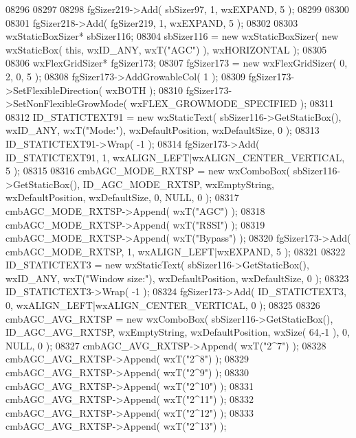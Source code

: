 \begin{DoxyCode}
08296     
08297     
08298     fgSizer219->Add( sbSizer97, 1, wxEXPAND, 5 );
08299     
08300     
08301     fgSizer218->Add( fgSizer219, 1, wxEXPAND, 5 );
08302     
08303     wxStaticBoxSizer* sbSizer116;
08304     sbSizer116 = \textcolor{keyword}{new} wxStaticBoxSizer( \textcolor{keyword}{new} wxStaticBox( \textcolor{keyword}{this}, wxID\_ANY, wxT(\textcolor{stringliteral}{"AGC"}) ), wxHORIZONTAL );
08305     
08306     wxFlexGridSizer* fgSizer173;
08307     fgSizer173 = \textcolor{keyword}{new} wxFlexGridSizer( 0, 2, 0, 5 );
08308     fgSizer173->AddGrowableCol( 1 );
08309     fgSizer173->SetFlexibleDirection( wxBOTH );
08310     fgSizer173->SetNonFlexibleGrowMode( wxFLEX\_GROWMODE\_SPECIFIED );
08311     
08312     ID_STATICTEXT91 = \textcolor{keyword}{new} wxStaticText( sbSizer116->GetStaticBox(), wxID\_ANY, wxT(\textcolor{stringliteral}{"Mode:"}), 
      wxDefaultPosition, wxDefaultSize, 0 );
08313     ID_STATICTEXT91->Wrap( -1 );
08314     fgSizer173->Add( ID_STATICTEXT91, 1, wxALIGN\_LEFT|wxALIGN\_CENTER\_VERTICAL, 5 );
08315     
08316     cmbAGC_MODE_RXTSP = \textcolor{keyword}{new} wxComboBox( sbSizer116->GetStaticBox(), 
      ID_AGC_MODE_RXTSP, wxEmptyString, wxDefaultPosition, wxDefaultSize, 0, NULL, 0 );
08317     cmbAGC_MODE_RXTSP->Append( wxT(\textcolor{stringliteral}{"AGC"}) );
08318     cmbAGC_MODE_RXTSP->Append( wxT(\textcolor{stringliteral}{"RSSI"}) );
08319     cmbAGC_MODE_RXTSP->Append( wxT(\textcolor{stringliteral}{"Bypass"}) );
08320     fgSizer173->Add( cmbAGC_MODE_RXTSP, 1, wxALIGN\_LEFT|wxEXPAND, 5 );
08321     
08322     ID_STATICTEXT3 = \textcolor{keyword}{new} wxStaticText( sbSizer116->GetStaticBox(), wxID\_ANY, wxT(\textcolor{stringliteral}{"Window size:"}), 
      wxDefaultPosition, wxDefaultSize, 0 );
08323     ID_STATICTEXT3->Wrap( -1 );
08324     fgSizer173->Add( ID_STATICTEXT3, 0, wxALIGN\_LEFT|wxALIGN\_CENTER\_VERTICAL, 0 );
08325     
08326     cmbAGC_AVG_RXTSP = \textcolor{keyword}{new} wxComboBox( sbSizer116->GetStaticBox(), 
      ID_AGC_AVG_RXTSP, wxEmptyString, wxDefaultPosition, wxSize( 64,-1 ), 0, NULL, 0 );
08327     cmbAGC_AVG_RXTSP->Append( wxT(\textcolor{stringliteral}{"2^7"}) );
08328     cmbAGC_AVG_RXTSP->Append( wxT(\textcolor{stringliteral}{"2^8"}) );
08329     cmbAGC_AVG_RXTSP->Append( wxT(\textcolor{stringliteral}{"2^9"}) );
08330     cmbAGC_AVG_RXTSP->Append( wxT(\textcolor{stringliteral}{"2^10"}) );
08331     cmbAGC_AVG_RXTSP->Append( wxT(\textcolor{stringliteral}{"2^11"}) );
08332     cmbAGC_AVG_RXTSP->Append( wxT(\textcolor{stringliteral}{"2^12"}) );
08333     cmbAGC_AVG_RXTSP->Append( wxT(\textcolor{stringliteral}{"2^13"}) );

\end{DoxyCode}
